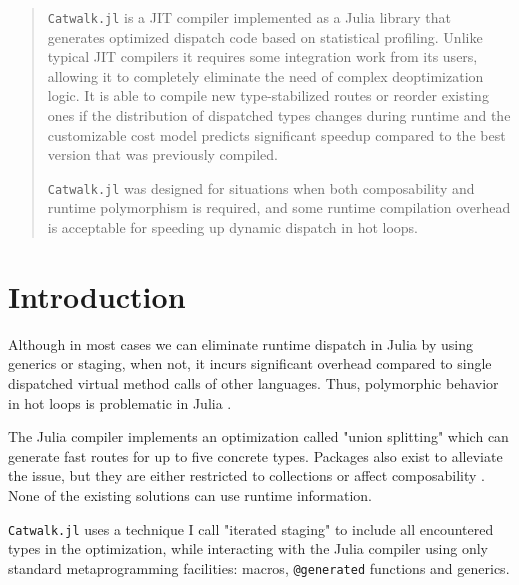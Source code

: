 \documentclass{juliacon}
\begin{document}


\maketitle

\begin{abstract}

\verb|Catwalk.jl| is a JIT compiler implemented as a Julia library that generates optimized dispatch code based on statistical profiling.
Unlike typical JIT compilers it requires some integration work from its users, allowing it to completely eliminate
the need of complex deoptimization logic. It is able to compile new type-stabilized routes or reorder existing ones if the distribution of dispatched types changes during runtime and the customizable cost model predicts significant speedup compared to the best version that was previously compiled.

\verb|Catwalk.jl| was designed for situations when both composability and runtime polymorphism is required,
and some runtime compilation overhead is acceptable for speeding up dynamic dispatch in hot loops.

\headingtable

\end{abstract}

\section{Introduction}

Although in most cases we can eliminate runtime dispatch in Julia by using generics or staging, when not, it incurs significant overhead compared to single dispatched virtual method calls of other languages.
Thus, polymorphic behavior in hot loops is problematic in Julia \cite{subtypeperf}.

The Julia compiler implements an optimization called "union splitting" \cite{unionsplitting} which can generate fast routes for up to five concrete types.
Packages also exist to alleviate the issue, but they are either restricted to collections \cite{typesortedcollections} \cite{singledispatcharrays} or affect composability \cite{manualdispatch}.
None of the existing solutions can use runtime information.

\verb|Catwalk.jl| \cite{catwalkwebsite} uses a technique I call "iterated staging" to include all encountered types in the optimization, while interacting with the Julia compiler using only standard metaprogramming facilities: macros, \verb|@generated| functions and generics.
\end{document}
